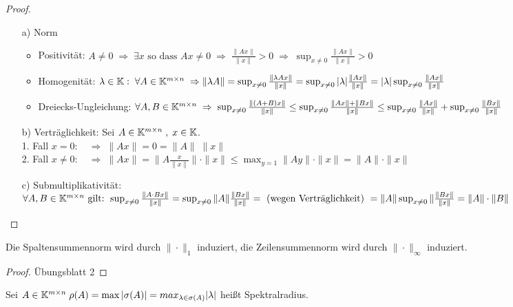 \begin{proof}
\begin{enumerate}
  \item [a)] Norm
    \begin{itemize}
      \item Positivität: $A \ne 0 \; \Rightarrow \; \exists x \text{ so dass }
    A x \ne 0 \; \Rightarrow \; \frac{\| A x \|}{\| x \|} > 0
    \; \Rightarrow \;  \sup_{ x\ne 0} \frac{\| A x \|}{\| x \|} > 0$
      \item Homogenität: $\lambda \in \mathbb K:\; \forall A \in \mathbb K^{m \times n} \;
      \Rightarrow \| \lambda A \| = \sup_{ x\ne 0} \frac{\| \lambda A x \|}{\| x \|} =
      \sup_{ x\ne 0} |\lambda|  \frac{\| A x \|}{\| x \|} =
      |\lambda| \sup_{ x\ne 0} \frac{\| A x \|}{\| x \|}$
      \item Dreiecks-Ungleichung: $\forall A, B  \in \mathbb K^{m \times n} \; \Rightarrow \;
      \sup_{ x\ne 0} \frac{\| (A + B) x \|}{\| x \|} \le
      \sup_{ x\ne 0} \frac{\| A x \| + \| B x \|}{\| x \|} \le
      \sup_{ x\ne 0} \frac{\| A x \|}{\| x \|} + \sup_{ x\ne 0} \frac{\| B x \|}{\| x \|}$
    \end{itemize}
  \item [b)] Verträglichkeit: Sei $A \in \mathbb K^{m \times n} \; , \; x \in \mathbb K$.\\
    1. Fall $x = 0  : \quad \Rightarrow \; \| A x \| = 0 = \|A \| \; \|x\| $\\
    2. Fall $x \ne 0  : \quad \Rightarrow \; \| A x \| =
    \| A \frac{x}{\|x\|}\| \cdot \| x \| \le
    \max_{y = 1} \| A y \| \cdot \| x \| = \| A \| \cdot \| x \|$
  \item [c)] Submultiplikativität: $\forall A, B  \in \mathbb K^{m \times n} \text{ gilt: }
  \sup_{ x\ne 0} \frac{\| A \cdot B x \|}{\| x \|} =
  \sup_{ x\ne 0} \| A \| \frac{\| B x \|}{\| x \|} = \\
  \text{ (wegen Verträglichkeit) } = \| A \|  \sup_{ x\ne 0}  \| \frac{\| B x \|}{\| x \|}
  = \|A\| \cdot \|B\|$
\end{enumerate}
\end{proof}


\begin{Satz}
  Die Spaltensummennorm wird durch $\| \cdot \|_1$ induziert, die Zeilensummennorm
  wird durch $\| \cdot \|_\infty$ induziert.
\end{Satz}
\begin{proof}  Übungsblatt 2 \end{proof}

\begin{Definition}[Spektralradius]
Sei $A \in \mathbb K^{m \times n} \;
 \rho (A) = \max |\sigma(A)| =  max_{\lambda \in \sigma(A)} |\lambda|$
 heißt Spektralradius.
\end{Definition}

